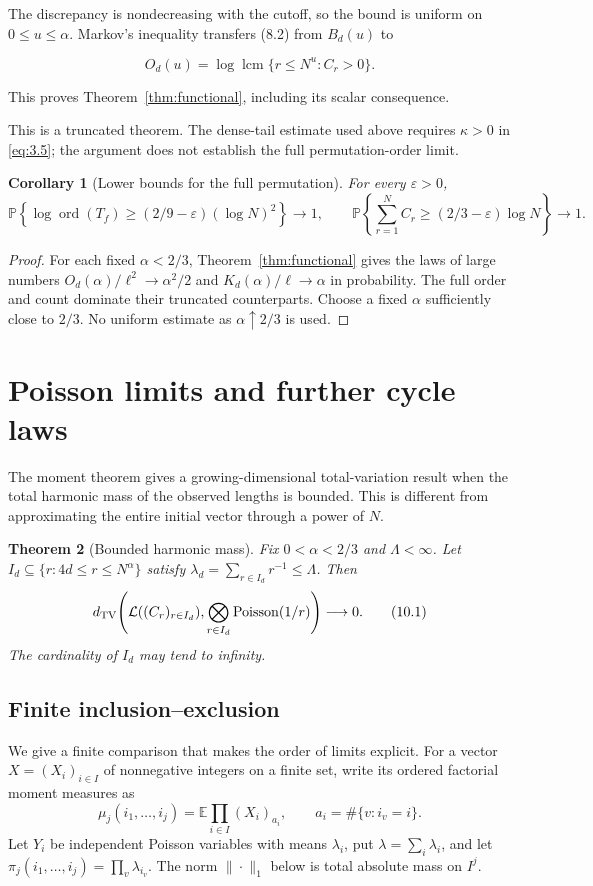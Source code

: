 \documentclass[11pt]{article}
\newtheorem{theorem}{Theorem}[section]
\newtheorem{corollary}[theorem]{Corollary}
\theoremstyle{remark}
\begin{document}
The discrepancy is nondecreasing with the cutoff, so the bound is
uniform on \(0\le u\le\alpha\). Markov's inequality transfers (8.2) from
\(B_d(u)\) to

\[
 O_d(u)=\log\operatorname{lcm}\{r\le N^u:C_r>0\}.
\]

This proves Theorem~\ref{thm:functional}, including its scalar consequence.

This is a truncated theorem. The dense-tail estimate used above requires
\(\kappa>0\) in \eqref{eq:3.5}; the argument does not establish the full
permutation-order limit.


\begin{corollary}[Lower bounds for the full permutation]\label{cor:full-lower}
For every $\varepsilon>0$,
\[
 \mathbb P\!\left\{
 \log\operatorname{ord}(T_f)
 \ge(2/9-\varepsilon)(\log N)^2\right\}\longrightarrow1,
 \qquad
 \mathbb P\!\left\{\sum_{r=1}^N C_r
 \ge(2/3-\varepsilon)\log N\right\}\longrightarrow1.
\]
\end{corollary}
\begin{proof}
For each fixed $\alpha<2/3$, Theorem~\ref{thm:functional} gives the laws of
large numbers $O_d(\alpha)/\ell^2\to\alpha^2/2$ and
$K_d(\alpha)/\ell\to\alpha$ in probability. The full order and count
dominate their truncated counterparts. Choose a fixed $\alpha$ sufficiently
close to $2/3$. No uniform estimate as $\alpha\uparrow2/3$ is used.
\end{proof}


\section{Poisson limits and further cycle laws}\label{sec:poisson}
The moment theorem gives a growing-dimensional total-variation result when
the total harmonic mass of the observed lengths is bounded. This is
different from approximating the entire initial vector through a power of $N$.

\begin{theorem}[Bounded harmonic mass]\label{thm:bounded-mass}
Fix $0<\alpha<2/3$ and $\Lambda<\infty$. Let
$I_d\subseteq\{r:4d\le r\le N^\alpha\}$ satisfy
$\lambda_d=\sum_{r\in I_d}r^{-1}\le\Lambda$. Then
\[
 d_{\rm TV}\!\left(
 \mathcal L((C_r)_{r\in I_d}),
 \bigotimes_{r\in I_d}\operatorname{Poisson}(1/r)
 \right)\longrightarrow0.
 \tag{10.1}\label{eq:10.1}
\]
The cardinality of $I_d$ may tend to infinity.
\end{theorem}

\subsection{Finite inclusion--exclusion}
We give a finite comparison that makes the order of limits explicit.
For a vector $X=(X_i)_{i\in I}$ of nonnegative integers on a finite set,
write its ordered factorial moment measures as
\[
 \mu_j(i_1,\ldots,i_j)
 =\mathbb E\prod_{i\in I}(X_i)_{a_i},
 \qquad a_i=\#\{v:i_v=i\}.
\]
Let $Y_i$ be independent Poisson variables with means $\lambda_i$, put
$\lambda=\sum_i\lambda_i$, and let
$\pi_j(i_1,\ldots,i_j)=\prod_v\lambda_{i_v}$.
The norm $\|\cdot\|_1$ below is total absolute mass on $I^j$.
\end{document}
